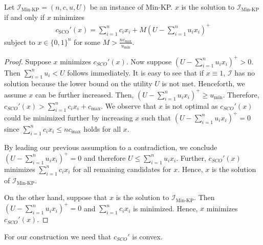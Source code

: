 \begin{lemma}
\label{lemma:integer_minimization}
Let $\mathcal{I}_{\text{Min-KP}} = (n, c, u, U)$ be an instance of Min-KP. $x$ is the solution to $\mathcal{I}_{\text{Min-KP}}$ if and only if $x$ minimizes \begin{align*}
    c_{\text{SCO}}'(x) = \sum_{i=1}^n c_i x_i + M\left(U - \sum_{i=1}^n u_i x_i\right)^+
\end{align*} subject to $x \in \{0,1\}^n$ for some $M > \frac{n c_{\text{max}}}{u_{\text{min}}}$.
\end{lemma}
\begin{proof}
Suppose $x$ minimizes $c_{SCO}'(x)$. Now suppose $(U - \sum_{i=1}^n u_i x_i)^+ > 0$. Then $\sum_{i=1}^n u_i < U$ follows immediately. It is easy to see that if $x \equiv 1$, $\mathcal{I}$ has no solution because the lower bound on the utility $U$ is not met. Henceforth, we assume $x$ can be further increased. Then, $(U - \sum_{i=1}^n u_i x_i)^+ \geq u_{\text{min}}$. Therefore, $c_{SCO}'(x) > \sum_{i=1}^n c_i x_i + c_{\text{max}}$. We observe that $x$ is not optimal as $c_{SCO}'(x)$ could be minimized further by increasing $x$ such that $(U - \sum_{i=1}^n u_i x_i)^+ = 0$ since $\sum_{i=1}^n c_i x_i \leq n c_{\text{max}}$ holds for all $x$.

By leading our previous assumption to a contradiction, we conclude $(U - \sum_{i=1}^n u_i x_i)^+ = 0$ and therefore $U \leq \sum_{i=1}^n u_i x_i$. Further, $c_{SCO}'(x)$ minimizes $\sum_{i=1}^n c_i x_i$ for all remaining candidates for $x$. Hence, $x$ is the solution of $\mathcal{I}_{\text{Min-KP}}$.

On the other hand, suppose that $x$ is the solution to $\mathcal{I}_{\text{Min-KP}}$. Then $(U - \sum_{i=1}^n u_i x_i)^+ = 0$ and $\sum_{i=1}^n c_i x_i$ is minimized. Hence, $x$ minimizes $c_{SCO}'(x)$.
\end{proof}

For our construction we need that $c_{SCO}'$ is convex.

